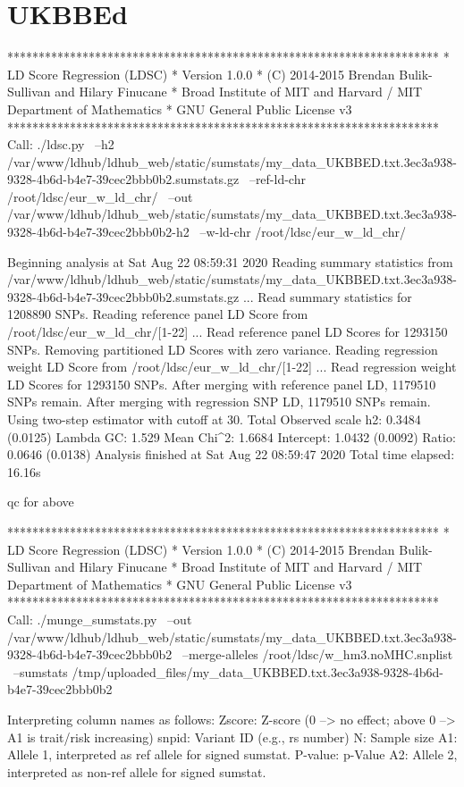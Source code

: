 \section{UKBBEd}


*********************************************************************
* LD Score Regression (LDSC)
* Version 1.0.0
* (C) 2014-2015 Brendan Bulik-Sullivan and Hilary Finucane
* Broad Institute of MIT and Harvard / MIT Department of Mathematics
* GNU General Public License v3
*********************************************************************
Call: 
./ldsc.py \
--h2 /var/www/ldhub/ldhub_web/static/sumstats/my_data_UKBBED.txt.3ec3a938-9328-4b6d-b4e7-39cec2bbb0b2.sumstats.gz \
--ref-ld-chr /root/ldsc/eur_w_ld_chr/ \
--out /var/www/ldhub/ldhub_web/static/sumstats/my_data_UKBBED.txt.3ec3a938-9328-4b6d-b4e7-39cec2bbb0b2-h2 \
--w-ld-chr /root/ldsc/eur_w_ld_chr/ 

Beginning analysis at Sat Aug 22 08:59:31 2020
Reading summary statistics from /var/www/ldhub/ldhub_web/static/sumstats/my_data_UKBBED.txt.3ec3a938-9328-4b6d-b4e7-39cec2bbb0b2.sumstats.gz ...
Read summary statistics for 1208890 SNPs.
Reading reference panel LD Score from /root/ldsc/eur_w_ld_chr/[1-22] ...
Read reference panel LD Scores for 1293150 SNPs.
Removing partitioned LD Scores with zero variance.
Reading regression weight LD Score from /root/ldsc/eur_w_ld_chr/[1-22] ...
Read regression weight LD Scores for 1293150 SNPs.
After merging with reference panel LD, 1179510 SNPs remain.
After merging with regression SNP LD, 1179510 SNPs remain.
Using two-step estimator with cutoff at 30.
Total Observed scale h2: 0.3484 (0.0125)
Lambda GC: 1.529
Mean Chi^2: 1.6684
Intercept: 1.0432 (0.0092)
Ratio: 0.0646 (0.0138)
Analysis finished at Sat Aug 22 08:59:47 2020
Total time elapsed: 16.16s


qc for above

*********************************************************************
* LD Score Regression (LDSC)
* Version 1.0.0
* (C) 2014-2015 Brendan Bulik-Sullivan and Hilary Finucane
* Broad Institute of MIT and Harvard / MIT Department of Mathematics
* GNU General Public License v3
*********************************************************************
Call: 
./munge_sumstats.py \
--out /var/www/ldhub/ldhub_web/static/sumstats/my_data_UKBBED.txt.3ec3a938-9328-4b6d-b4e7-39cec2bbb0b2 \
--merge-alleles /root/ldsc/w_hm3.noMHC.snplist \
--sumstats /tmp/uploaded_files/my_data_UKBBED.txt.3ec3a938-9328-4b6d-b4e7-39cec2bbb0b2 

Interpreting column names as follows:
Zscore:	Z-score (0 --> no effect; above 0 --> A1 is trait/risk increasing)
snpid:	Variant ID (e.g., rs number)
N:	Sample size
A1:	Allele 1, interpreted as ref allele for signed sumstat.
P-value:	p-Value
A2:	Allele 2, interpreted as non-ref allele for signed sumstat.

